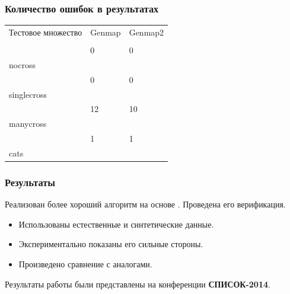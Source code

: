 \documentclass{beamer}
\begin{document}
\begin{frame}
  \frametitle{Количество ошибок в результатах}

\begin{tabular}{|l|l|l|}
  \hline
  Тестовое множество & Genmap & Genmap2 \\
  & & \\
  \hline
  & 0 & 0 \\
  nocross & & \\
  \hline
  & 0 & 0 \\
  singlecross & & \\
  \hline
  & 12 & 10 \\
  manycross & & \\
  \hline
  & 1 & 1 \\
  cats & & \\
  \hline
\end{tabular}

\end{frame}

\begin{frame}
  \frametitle{Результаты}
  Реализован более хороший алгоритм на основе \genmap. Проведена его
  верификация.
  \begin{itemize}
  \item Использованы естественные и синтетические данные.
  \item Экспериментально показаны его сильные стороны.
  \item Произведено сравнение с аналогами.
  \end{itemize}

  \bigskip

  Результаты работы были представлены на конференции
  \textbf{СПИСОК-2014}.
\end{frame}
\end{document}
